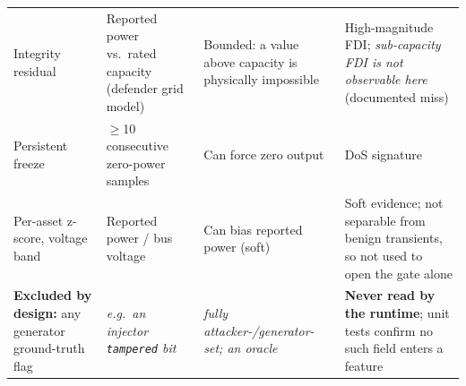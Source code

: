 {\begin{xltabular}{\textwidth}{@{}>{\raggedright\arraybackslash}p{0.19\textwidth}
 >{\raggedright\arraybackslash}p{0.22\textwidth}
 >{\raggedright\arraybackslash}p{0.13\textwidth}
 >{\raggedright\arraybackslash}X@{}}
Integrity residual & Reported power vs.\ rated capacity (defender grid model) & Bounded: a value above capacity is physically impossible & High-magnitude FDI; \emph{sub-capacity FDI is not observable here} (documented miss) \\
\addlinespace[2pt]
Persistent freeze & $\ge$10 consecutive zero-power samples & Can force zero output & DoS signature \\
\addlinespace[2pt]
Per-asset z-score, voltage band & Reported power / bus voltage & Can bias reported power (soft) & Soft evidence; not separable from benign transients, so not used to open the gate alone \\
\midrule
\textbf{Excluded by design:} any generator ground-truth flag & \emph{e.g.\ an injector \texttt{tampered} bit} & \emph{fully attacker-/generator-set; an oracle} & \textbf{Never read by the runtime}; unit tests confirm no such field enters a feature \\
\end{xltabular}
\par}

